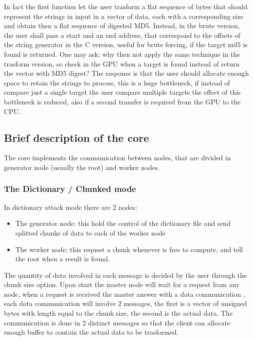 \documentclass[12pt,a4paper]{article}
\begin{document}
In fact the first function let the user trasform a flat sequence of bytes that should represent the strings in input in a vector of data, each with a corresponding size and obtain then a flat sequence of digested MD5. Instead, in the brute version, the user shall pass a start and an end address, that correspond to the offsets of the string generator in the C version, useful for brute forcing, if the target md5 is found is returned. One may ask: why then not apply the same technique in the trasform version, so check in the GPU when a target is found instead of return the vector with MD5 digest? The response is that the user should allocate enough space to retain the strings to process, this is a huge bottleneck, if instead of compare just a single target the user compare multiple targets the effect of this bottleneck is reduced, also if a second transfer is required from the GPU to the CPU.

\subsection{Brief description of the core}
The core implements the communication between nodes, that are divided in generator node (usually the root) and worker nodes. 

\subsubsection{The Dictionary / Chunked mode}
In dictionary attack mode there are 2 nodes:
\begin{itemize}
    \item The generator node: this hold the control of the dictionary file and send splitted chunks of data to each of the worker node 
    \item The worker node: this request a chunk whenever is free to compute, and tell the root when a result is found.
\end{itemize} 

The quantity of data involved in each message is decided by the user through the chunk size option. Upon start the master node will wait for a request from any node, when a request is received the master answer with a data communication , each data communication will involve 2 messages, the first is a vector of unsigned bytes with length equal to the chunk size, the second is the actual data. The communication is done in 2 distinct messages so that the client can allocate enough buffer to contain the actual data to be trasformed. 
\end{document}
